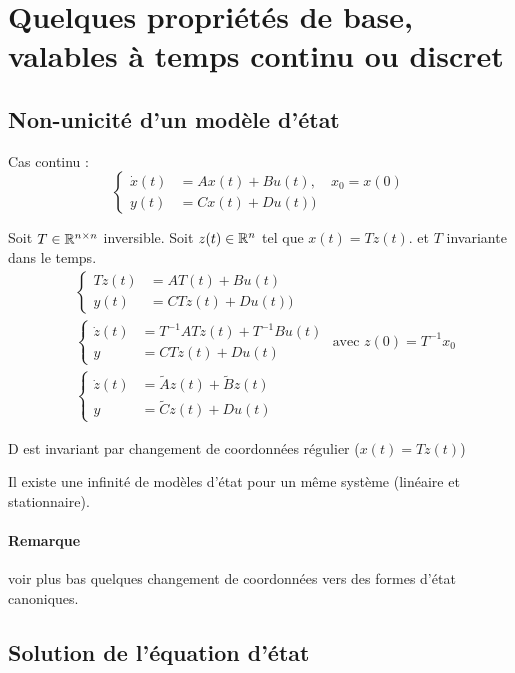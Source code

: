\documentclass[main.tex]{subfiles}
\begin{document}
\section{Quelques propriétés de base, valables à temps continu ou discret}

\subsection{Non-unicité d'un modèle d'état}

Cas continu :
\[
\left\{
\begin{array}{ll}
\dot{x}(t) & = Ax(t)+Bu(t), \quad x_0=x(0) \\
y(t) & = Cx(t)+Du(t))
\end{array}
\right.
\]

Soit $T\in\mathbb{R}^{n\times n}$ inversible. Soit $z(t) \in \mathbb{R}^n$ tel que $x(t) = T z(t)$. et $T$ invariante dans le temps.
\begin{align*}
  & \begin{cases}
    T\dot{z}(t) & = AT(t)+Bu(t) \\
    y(t) & = CTz(t)+Du(t))
\end{cases}
 \\
& \begin{cases}
\dot{z}(t) & = T^{-1}ATz(t) + T^{-1}Bu(t) \\
y & = CT z(t) + Du(t)
\end{cases}  \text{ avec } z(0) = T^{-1}x_0 \\
& \begin{cases}
\dot{z}(t) & = \tilde{A}z(t) + \tilde{B}z(t) \\
y & = \tilde{C}z(t) + Du(t)
\end{cases}
\end{align*}

D est invariant par changement de coordonnées régulier ($x(t) = Tz(t)$)

\begin{prop}
Il existe une infinité de modèles d'état pour un même système (linéaire et stationnaire).
\end{prop}

\paragraph{Remarque} voir plus bas quelques changement de coordonnées vers des formes d'état canoniques.
\subsection{Solution de l'équation d'état}
\end{document}
